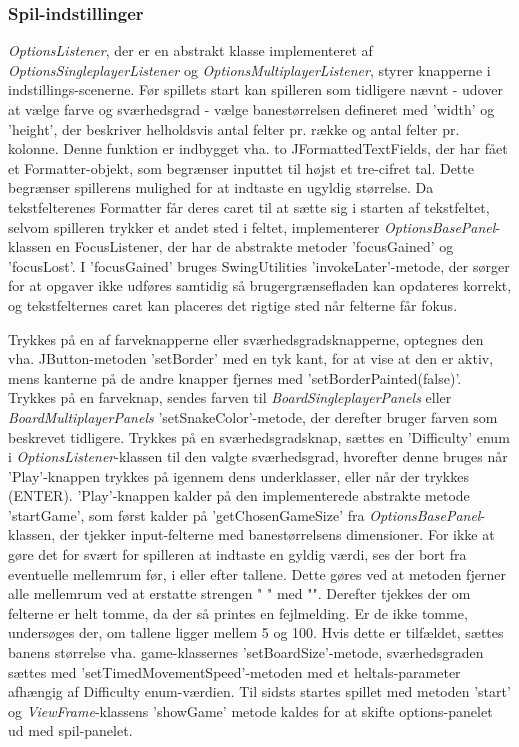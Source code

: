 \subsubsection{Spil-indstillinger}
\textit{OptionsListener}, der er en abstrakt klasse implementeret af \textit{OptionsSingleplayerListener} og \textit{OptionsMultiplayerListener}, styrer knapperne i indstillings-scenerne. Før spillets start kan spilleren som tidligere nævnt - udover at vælge farve og sværhedsgrad - vælge banestørrelsen defineret med 'width' og 'height', der beskriver helholdsvis antal felter pr. række og antal felter pr. kolonne. Denne funktion er indbygget vha. to JFormattedTextFields, der har fået et Formatter-objekt, som begrænser inputtet til højst et tre-cifret tal. Dette begrænser spillerens mulighed for at indtaste en ugyldig størrelse. Da tekstfelterenes Formatter får deres caret til at sætte sig i starten af tekstfeltet, selvom spilleren trykker et andet sted i feltet, implementerer \textit{OptionsBasePanel}-klassen en FocusListener, der har de abstrakte metoder 'focusGained' og 'focusLost'. I 'focusGained' bruges SwingUtilities 'invokeLater'-metode, der sørger for at opgaver ikke udføres samtidig så brugergrænsefladen kan opdateres korrekt, og tekstfelternes caret kan placeres det rigtige sted når felterne får fokus.
\newline

Trykkes på en af farveknapperne eller sværhedsgradsknapperne, optegnes den vha. JButton-metoden 'setBorder' med en tyk kant, for at vise at den er aktiv, mens kanterne på de andre knapper fjernes med 'setBorderPainted(false)'. Trykkes på en farveknap, sendes farven til \textit{BoardSingleplayerPanels} eller \textit{BoardMultiplayerPanels} 'setSnakeColor'-metode, der derefter bruger farven som beskrevet tidligere. Trykkes på en sværhedsgradsknap, sættes  en 'Difficulty' enum i \textit{OptionsListener}-klassen til den valgte sværhedsgrad, hvorefter denne bruges når 'Play'-knappen trykkes på igennem dens underklasser, eller når der trykkes (ENTER). 'Play'-knappen kalder på den implementerede abstrakte metode 'startGame', som først kalder på 'getChosenGameSize' fra \textit{OptionsBasePanel}-klassen, der tjekker input-felterne med banestørrelsens dimensioner. For ikke at gøre det for svært for spilleren at indtaste en gyldig værdi, ses der bort fra eventuelle mellemrum før, i eller efter tallene. Dette gøres ved at metoden fjerner alle mellemrum ved at erstatte strengen " " med "". Derefter tjekkes der om felterne er helt tomme, da der så printes en fejlmelding. Er de ikke tomme, undersøges der, om tallene ligger mellem 5 og 100. Hvis dette er tilfældet, sættes banens størrelse vha. game-klassernes 'setBoardSize'-metode, sværhedsgraden sættes med 'setTimedMovementSpeed'-metoden med et heltals-parameter afhængig af Difficulty enum-værdien. Til sidsts startes spillet med metoden 'start' og \textit{ViewFrame}-klassens 'showGame' metode kaldes for at skifte options-panelet ud med spil-panelet.